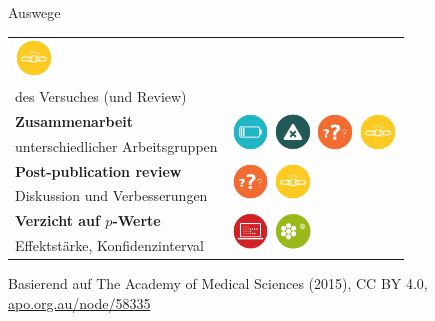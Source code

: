 \documentclass{beamer}
\begin{document}
\begin{frame}{Auswege}
\begin{tabular}{>{\raggedright}p{5.5cm}l}
{            \includegraphics[width=1cm]{weak_experimental_design}} \\
        des Versuches (und Review) & \\[1em]
        \textbf{Zusammenarbeit} & \multirow{2}{*}{%
            \includegraphics[width=1cm]{underpowered_study}
            \includegraphics[width=1cm]{errors}
            \includegraphics[width=1cm]{underspecified_method}
            \includegraphics[width=1cm]{weak_experimental_design}} \\
        unterschiedlicher Arbeitsgruppen & \\[1em]
        \textbf{Post-publication review} & \multirow{2}{*}{%
            \includegraphics[width=1cm]{underspecified_method}
            \includegraphics[width=1cm]{weak_experimental_design}} \\
        Diskussion und Verbesserungen & \\[1em]
        \textbf{Verzicht auf $p$-Werte} & \multirow{2}{*}{%
            \includegraphics[width=1cm]{data_dredging}
            \includegraphics[width=1cm]{omitting_null_results}} \\
        Effektstärke, Konfidenzinterval
        & \\
    \end{tabular}

    \vspace{1cm}
    {\ft Basierend auf The Academy of Medical Sciences (2015), CC
    BY 4.0, \href{http://apo.org.au/node/58335}{apo.org.au/node/58335}}

\end{frame}
\end{document}
